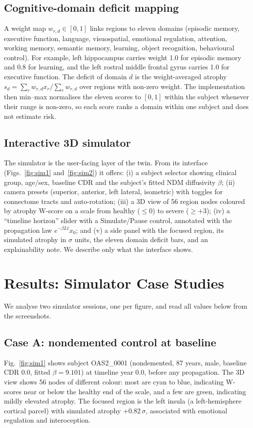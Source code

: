 \documentclass[conference]{IEEEtran}
\begin{document}
\subsection{Cognitive-domain deficit mapping}
A weight map $w_{r,d}\in[0,1]$ links regions to eleven domains (episodic memory, executive function, language, visuospatial, emotional regulation, attention, working memory, semantic memory, learning, object recognition, behavioural control). For example, left hippocampus carries weight 1.0 for episodic memory and 0.8 for learning, and the left rostral middle frontal gyrus carries 1.0 for executive function. The deficit of domain $d$ is the weight-averaged atrophy $s_d=\sum_r w_{r,d}x_r/\sum_r w_{r,d}$ over regions with non-zero weight. The implementation then min--max normalises the eleven scores to $[0,1]$ within the subject whenever their range is non-zero, so each score ranks a domain within one subject and does not estimate risk.

\subsection{Interactive 3D simulator}
The simulator is the user-facing layer of the twin. From its interface (Figs.~\ref{fig:sim1} and~\ref{fig:sim2}) it offers: (i) a subject selector showing clinical group, age/sex, baseline CDR and the subject's fitted NDM diffusivity $\beta$; (ii) camera presets (superior, anterior, left lateral, isometric) with toggles for connectome tracts and auto-rotation; (iii) a 3D view of 56 region nodes coloured by atrophy W-score on a scale from healthy ($\le0$) to severe ($\ge+3$); (iv) a ``timeline horizon'' slider with a Simulate/Pause control, annotated with the propagation law $e^{-\beta Lt}x_0$; and (v) a side panel with the focused region, its simulated atrophy in $\sigma$ units, the eleven domain deficit bars, and an explainability note. We describe only what the interface shows.

\section{Results: Simulator Case Studies}\label{sec:results}
We analyse two simulator sessions, one per figure, and read all values below from the screenshots.

\subsection{Case A: nondemented control at baseline}
Fig.~\ref{fig:sim1} shows subject OAS2\_0001 (nondemented, 87 years, male, baseline CDR 0.0, fitted $\beta=9.101$) at timeline year 0.0, before any propagation. The 3D view shows 56 nodes of different colour: most are cyan to blue, indicating W-scores near or below the healthy end of the scale, and a few are green, indicating mildly elevated atrophy. The focused region is the left insula (a left-hemisphere cortical parcel) with simulated atrophy $+0.82\,\sigma$, associated with emotional regulation and interoception.
\end{document}
